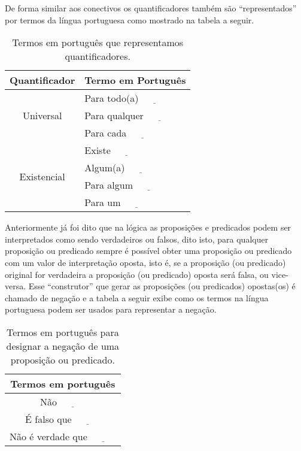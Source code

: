 De forma similar aos conectivos os quantificadores também são ``representados'' por termos da língua portuguesa como mostrado na tabela a seguir.

\begin{table}[h]
	\centering
	\begin{tabular}{cl}
		\hline
		\textbf{Quantificador}  & \textbf{Termo em Portugu\^es} \\ \hline
		\multirow{3}{*}{Universal}    & Para todo(a) $\underline{ \ \ \ \ \ \ \ \ \ \ \ \ }$\\
		& Para qualquer $\underline{ \ \ \ \ \ \ \ \ \ \ \ \ }$\\
		& Para cada $\underline{ \ \ \ \ \ \ \ \ \ \ \ \ }$\\ \hline
		\multirow{4}{*}{Existencial} & Existe $\underline{ \ \ \ \ \ \ \ \ \ \ \ \ }$\\
		& Algum(a) $\underline{ \ \ \ \ \ \ \ \ \ \ \ \ }$\\
		& Para algum $\underline{ \ \ \ \ \ \ \ \ \ \ \ \ }$\\
		& Para um $\underline{ \ \ \ \ \ \ \ \ \ \ \ \ }$\\ \hline
	\end{tabular}
	\caption{Termos em português que representamos quantificadores.}
	\label{tab:QuantificadoresPT-BR}
\end{table}

Anteriormente já foi dito que na lógica as proposições e predicados podem ser interpretados como sendo verdadeiros ou falsos, dito isto, para qualquer proposição ou predicado sempre é possível obter uma proposição ou predicado com um valor de interpretação oposta, isto é, se a proposição (ou predicado) original for verdadeira a proposição (ou predicado) oposta será falsa, ou vice-versa. Esse ``construtor'' que gerar as proposições (ou predicados) opostas(os) é chamado de negação e a tabela a seguir exibe como os termos na língua portuguesa podem ser usados para representar a negação.

\begin{table}[h]
	\centering
	\begin{tabular}{c}
		\hline
		\textbf{Termos em português}\\
		\hline
		Não $\underline{ \ \ \ \ \ \ \ \ \ \ \ \ }$ \\
		É falso que $\underline{ \ \ \ \ \ \ \ \ \ \ \ \ }$\\
		Não é verdade que $\underline{ \ \ \ \ \ \ \ \ \ \ \ \ }$ \\ \hline
	\end{tabular}
	\caption{Termos em português para designar a negação de uma proposição ou predicado.}
	\label{tab:NegacaoPortugues}
\end{table}

